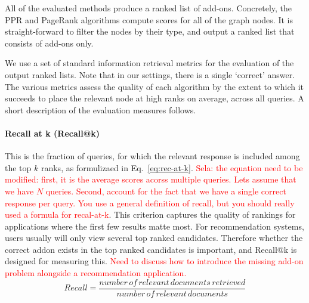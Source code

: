 \documentclass[11pt,oneside]{book}
\begin{document}

All of the evaluated methods produce a ranked list of add-ons. 
Concretely, the PPR and PageRank algorithms compute scores for all of the graph nodes.
It is straight-forward to filter the nodes by their type, and output a ranked list that consists of add-ons only.

We use a set of standard information retrieval metrics for the evaluation of the output ranked lists. Note that in our settings, there is a single `correct' answer. The various metrics assess the quality of each algorithm by the extent to which it succeeds to 
place the relevant node at high ranks on average, across all queries. A short description of the evaluation measures follows.

\paragraph{Recall at k (Recall@k)}
This is the fraction of queries, for which the relevant response is included among the top $k$ ranks, as formulizaed in Eq.~\eqref{eq:rec-at-k}. \textcolor{red}{Sela: the equation need to be modified: first, it is the average scores acorss multiple queries. Lets assume that we have $N$ queries. Second, account for the fact that we have a single correct response per query. You use a general definition of recall, but you should really used a formula for recal-at-k}. This criterion captures the quality of rankings for applications where the first few results matte most. 
For recommendation systems, users usually will only view several top ranked candidates. Therefore
whether the correct addon exists in the top ranked candidates is
important, and Recall@k is designed for measuring this. \textcolor{red}{Need to discuss how to introduce the missing add-on problem alongside a recommendation application.}
\begin{equation}
 Recall = \frac{number \, of \, relevant \, documents \, retrieved}{number \, of \, relevant \, documents}
\label{eq:rec-at-k}
\end{equation}

\end{document}
